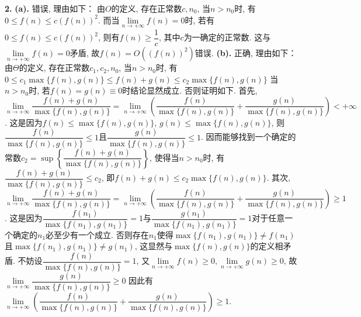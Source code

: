 \documentclass[UTF8]{ctexart}
\begin{document}
	\begin{solution}\textnormal{\textbf{2.}}
		\textbf{(a).} 错误, 理由如下：\newline
		由$O$的定义, 存在正常数$c, n_0$, 当$n > n_0$时, 有$0 \leq f(n) \leq c(f(n))^2$.\newline
		而当$\lim\limits_{n \to +\infty}f(n) = 0$时, 若有$0 \leq f(n) \leq c(f(n))^2$, 则有$f(n) \geq \dfrac{1}{c}$, 其中$c$为一确定的正常数.\newline
		这与$\lim\limits_{n \to +\infty}f(n) = 0$矛盾, 故$f(n) = O\left((f(n))^2\right)$错误.\newline
		\textbf{(b).} 正确, 理由如下：\newline
		由$\Theta$的定义, 存在正常数$c_1, c_2, n_0$, 当$n > n_0$时, 有$0 \leq c_1\max\{f(n), g(n)\} \leq f(n) + g(n) \leq c_2\max\{f(n), g(n)\}$\newline
		当$n > n_0$时, 若$f(n) = g(n) \equiv 0$时结论显然成立. 否则证明如下.\newline
		首先, $\lim\limits_{n \to +\infty}\dfrac{f(n) + g(n)}{\max\{f(n), g(n)\}} = \lim\limits_{n \to +\infty}\left(\dfrac{f(n)}{\max\{f(n), g(n)\}} + \dfrac{g(n)}{\max\{f(n), g(n)\}}\right) < +\infty$.\newline
		这是因为$f(n) \leq \max\{f(n), g(n)\}$, $g(n) \leq \max\{f(n), g(n)\}$, 则$\dfrac{f(n)}{\max\{f(n), g(n)\}} \leq 1$且$\dfrac{g(n)}{\max\{f(n), g(n)\}} \leq 1$.\newline
		因而能够找到一个确定的常数$c_2 = \sup\left\{\dfrac{f(n) + g(n)}{\max\{f(n), g(n)\}}\right\}$, 使得当$n > n_0$时, 有$\dfrac{f(n) + g(n)}{\max\{f(n), g(n)\}} \leq c_2$, 即$f(n) + g(n) \leq c_2\max\{f(n), g(n)\}$.\newline
		其次, $\lim\limits_{n \to +\infty}\dfrac{f(n) + g(n)}{\max\{f(n), g(n)\}} = \lim\limits_{n \to +\infty}\left(\dfrac{f(n)}{\max\{f(n), g(n)\}} + \dfrac{g(n)}{\max\{f(n), g(n)\}}\right) \geq 1$.\newline
		这是因为$\dfrac{f(n_1)}{\max\{f(n_1), g(n_1)\}} = 1$与$\dfrac{g(n_1)}{\max\{f(n_1), g(n_1)\}} = 1$对于任意一个确定的$n_1$必至少有一个成立. 否则存在$n_1$使得$\max\{f(n_1), g(n_1)\} \neq f(n_1)$且$\max\{f(n_1), g(n_1)\} \neq g(n_1)$, 这显然与$\max\{f(n), g(n)\}$的定义相矛盾.\newline
		不妨设$\dfrac{f(n)}{\max\{f(n), g(n)\}} = 1$, 又$\lim\limits_{n \to +\infty}f(n) \geq 0, \lim\limits_{n \to +\infty}g(n) \geq 0$, 故$\lim\limits_{n \to +\infty}\dfrac{g(n)}{\max\{f(n), g(n)\}} \geq 0$\newline
		因此有$\lim\limits_{n \to +\infty}\left(\dfrac{f(n)}{\max\{f(n), g(n)\}} + \dfrac{g(n)}{\max\{f(n), g(n)\}}\right) \geq 1$.\newline

\end{solution}
\end{document}
